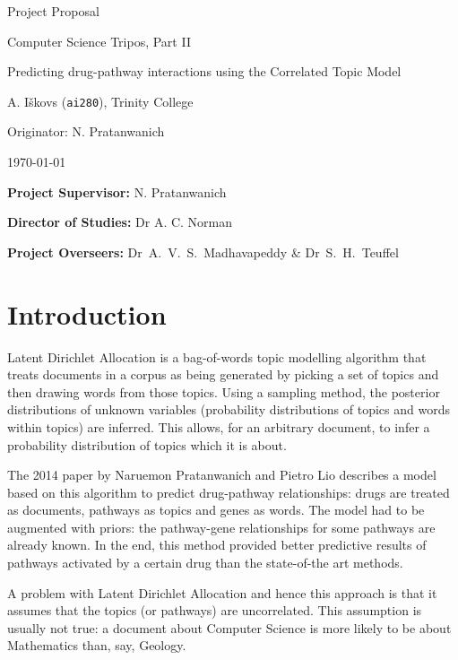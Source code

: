 \documentclass[12pt,a4]{article}
\begin{document}
\vfil

\centerline{\large Project Proposal}
\vspace{0.3in}
\centerline{\large Computer Science Tripos, Part II}
\vspace{0.3in}
\centerline{\Large Predicting drug-pathway interactions using the Correlated Topic Model}
\vspace{0.4in}
\centerline{\large A. I\v{s}kovs (\texttt{ai280}), Trinity College}
\vspace{0.3in}
\centerline{\large Originator: N. Pratanwanich}
\vspace{0.3in}
\centerline{\large \today}

\vfil


\noindent
{\bf Project Supervisor:} N. Pratanwanich
\vspace{0.2in}

\noindent
{\bf Director of Studies:} Dr A. C. Norman
\vspace{0.2in}
\noindent
 
\noindent
{\bf Project Overseers:} Dr~A.~V.~S.~Madhavapeddy  \& Dr~S.~H.~Teuffel

\pagebreak


\section*{Introduction}

Latent Dirichlet Allocation\cite{Blei} is a bag-of-words topic modelling algorithm that treats documents in a corpus as being generated by picking a set of topics and then drawing words from those topics. Using a sampling method, the posterior distributions of unknown variables (probability distributions of topics and words within topics) are inferred. This allows, for an arbitrary document, to infer a probability distribution of topics which it is about.

The 2014 paper\cite{Pratanwanich2014} by Naruemon Pratanwanich and Pietro Lio describes a model based on this algorithm to predict drug-pathway relationships:  drugs are treated as documents, pathways as topics and genes as words. The model had to be augmented with priors: the pathway-gene relationships for some pathways are already known. In the end, this method provided better predictive results of pathways activated by a certain drug than the state-of-the art methods.

A problem with Latent Dirichlet Allocation and hence this approach is that it assumes that the topics (or pathways) are uncorrelated. This assumption is usually not true: a document about Computer Science is more likely to be about Mathematics than, say, Geology. 
\end{document}
